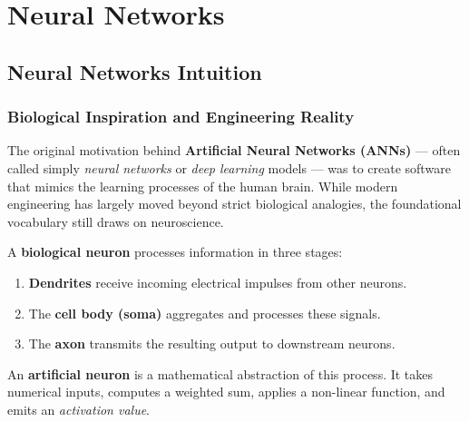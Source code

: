 \chapter{Neural Networks}

\section{Neural Networks Intuition}

\subsection{Biological Inspiration and Engineering Reality}

The original motivation behind \textbf{Artificial Neural Networks (ANNs)} ---
often called simply \emph{neural networks} or \emph{deep learning} models ---
was to create software that mimics the learning processes of the human brain.
While modern engineering has largely moved beyond strict biological analogies,
the foundational vocabulary still draws on neuroscience.

A \textbf{biological neuron} processes information in three stages:
\begin{enumerate}
\item \textbf{Dendrites} receive incoming electrical impulses from other neurons.
\item The \textbf{cell body (soma)} aggregates and processes these signals.
\item The \textbf{axon} transmits the resulting output to downstream neurons.
\end{enumerate}

An \textbf{artificial neuron} is a mathematical abstraction of this process.
It takes numerical inputs, computes a weighted sum, applies a non-linear
function, and emits an \textit{activation value}.

